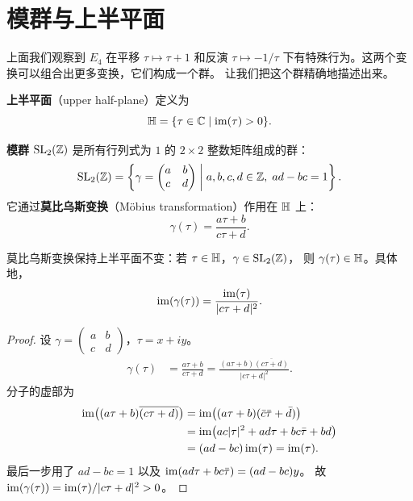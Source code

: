 \section{模群与上半平面}
\label{sec:modular-group-action}

上面我们观察到 $E_4$ 在平移 $\tau \mapsto \tau + 1$ 和反演 $\tau \mapsto -1/\tau$
下有特殊行为。这两个变换可以组合出更多变换，它们构成一个群。
让我们把这个群精确地描述出来。

\begin{definition}[上半平面]
\label{def:upper-half-plane}
\textbf{上半平面}（upper half-plane）定义为
\[
  \mathbb{H} = \{ \tau \in \mathbb{C} \mid \operatorname{im}(\tau) > 0 \}.
\]
\end{definition}

\begin{definition}[模群]
\label{def:modular-group}
\textbf{模群} $\mathrm{SL}_2(\mathbb{Z})$ 是所有行列式为 $1$ 的 $2 \times 2$ 整数矩阵组成的群：
\[
  \mathrm{SL}_2(\mathbb{Z}) = \left\{
    \gamma = \begin{pmatrix} a & b \\ c & d \end{pmatrix}
    \;\middle|\; a, b, c, d \in \mathbb{Z},\; ad - bc = 1
  \right\}.
\]
它通过\textbf{莫比乌斯变换}（Möbius transformation）作用在 $\mathbb{H}$ 上：
\[
  \gamma(\tau) = \frac{a\tau + b}{c\tau + d}.
\]
\end{definition}

\begin{proposition}
\label{prop:mobius-preserves-H}
莫比乌斯变换保持上半平面不变：若 $\tau \in \mathbb{H}$，$\gamma \in \mathrm{SL}_2(\mathbb{Z})$，
则 $\gamma(\tau) \in \mathbb{H}$。具体地，
\[
  \operatorname{im}(\gamma(\tau)) = \frac{\operatorname{im}(\tau)}{|c\tau + d|^2}.
\]
\end{proposition}

\begin{proof}
设 $\gamma = \begin{pmatrix} a & b \\ c & d \end{pmatrix}$，$\tau = x + iy$。
\begin{align}
  \gamma(\tau)
  &= \frac{a\tau + b}{c\tau + d}
  = \frac{(a\tau + b)\overline{(c\tau + d)}}{|c\tau + d|^2}.
\end{align}
分子的虚部为
\begin{align}
  \operatorname{im}\bigl((a\tau + b)\overline{(c\tau + d)}\bigr)
  &= \operatorname{im}\bigl((a\tau + b)(\bar c \bar\tau + \bar d)\bigr) \\
  &= \operatorname{im}\bigl(ac|\tau|^2 + ad\tau + bc\bar\tau + bd\bigr) \\
  &= (ad - bc)\operatorname{im}(\tau) = \operatorname{im}(\tau).
\end{align}
最后一步用了 $ad - bc = 1$ 以及 $\operatorname{im}(ad\tau + bc\bar\tau) = (ad - bc)y$。
故 $\operatorname{im}(\gamma(\tau)) = \operatorname{im}(\tau)/|c\tau + d|^2 > 0$。
\end{proof}

